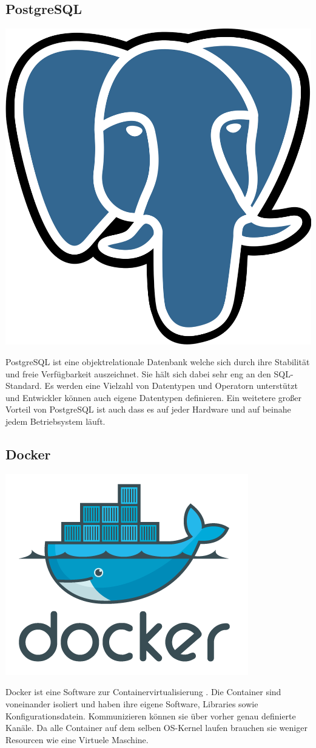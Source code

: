 \subsection{PostgreSQL}
\includegraphics[scale=0.015]{pics/postgresqlLogo.svg.png}

PostgreSQL ist eine objektrelationale Datenbank welche sich durch ihre Stabilität und freie Verfügbarkeit auszeichnet. 
Sie hält sich dabei sehr eng an den SQL-Standard. Es werden eine Vielzahl von Datentypen und Operatorn unterstützt und 
Entwickler können auch eigene Datentypen definieren. Ein weitetere großer Vorteil von PostgreSQL ist auch dass es auf 
jeder Hardware und auf beinahe jedem Betriebsystem läuft. 
\subsection{Docker}
\includegraphics[scale=0.05]{pics/dockerLogo.png}

Docker ist eine Software zur Containervirtualisierung . Die Container sind voneinander isoliert und haben ihre eigene Software, 
Libraries sowie Konfigurationsdatein. Kommunizieren können sie über vorher genau definierte Kanäle. Da alle Container 
auf dem selben OS-Kernel laufen brauchen sie weniger Resourcen wie eine Virtuele Maschine.